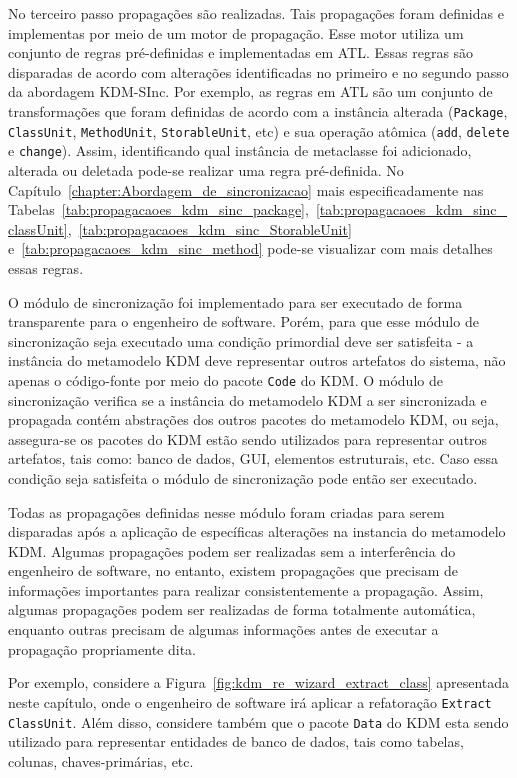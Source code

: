 No terceiro passo propagações são realizadas. Tais propagações foram definidas e implementas por meio de um motor de propagação. Esse motor utiliza um conjunto de regras pré-definidas e implementadas em ATL. Essas regras são disparadas de acordo com alterações identificadas no primeiro e no segundo passo da abordagem KDM-SInc. Por exemplo, as regras em ATL são um conjunto de transformações que foram definidas de acordo com a instância alterada (\texttt{Package}, \texttt{ClassUnit}, \texttt{MethodUnit}, \texttt{StorableUnit}, etc) e sua operação atômica (\texttt{add}, \texttt{delete} e \texttt{change}). Assim, identificando qual instância de metaclasse foi adicionado, alterada ou deletada pode-se realizar uma regra pré-definida. No Capítulo~\ref{chapter:Abordagem_de_sincronizacao} mais especificadamente nas Tabelas~\ref{tab:propagacaoes_kdm_sinc_package},~\ref{tab:propagacaoes_kdm_sinc_classUnit},~\ref{tab:propagacaoes_kdm_sinc_StorableUnit} e~\ref{tab:propagacaoes_kdm_sinc_method} pode-se visualizar com mais detalhes essas regras.

O módulo de sincronização foi implementado para ser executado de forma transparente para o engenheiro de software. Porém, para que esse módulo de sincronização seja executado uma condição primordial deve ser satisfeita - a instância do metamodelo KDM deve representar outros artefatos do sistema, não apenas o código-fonte por meio do pacote \texttt{Code} do KDM. O módulo de sincronização verifica se a instância do metamodelo KDM a ser sincronizada e propagada contém abstrações dos outros pacotes do metamodelo KDM, ou seja, assegura-se os pacotes do KDM estão sendo utilizados para representar outros artefatos, tais como: banco de dados, GUI, elementos estruturais, etc. Caso essa condição seja satisfeita o módulo de sincronização pode então ser executado.

Todas as propagações definidas nesse módulo foram criadas para serem disparadas após a aplicação de específicas alterações na instancia do metamodelo KDM. Algumas propagações podem ser realizadas sem a interferência do engenheiro de software, no entanto, existem propagações que precisam de informações importantes para realizar consistentemente a propagação. Assim, algumas propagações podem ser realizadas de forma totalmente automática, enquanto outras precisam de algumas informações antes de executar a propagação propriamente dita.

Por exemplo, considere a Figura~\ref{fig:kdm_re_wizard_extract_class} apresentada neste capítulo, onde o engenheiro de software irá aplicar a refatoração \texttt{Extract ClassUnit}. Além disso, considere também que o pacote \texttt{Data} do KDM esta sendo utilizado para representar entidades de banco de dados, tais como tabelas, colunas, chaves-primárias, etc.

